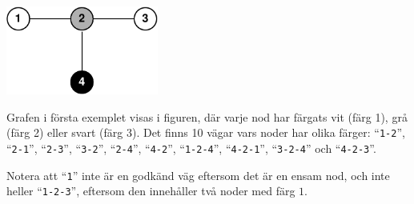 \section*{}

\includegraphics[width=5cm]{pathsfig.pdf}

Grafen i första exemplet visas i figuren, där varje nod har färgats vit (färg 1), grå (färg 2) eller svart (färg 3). Det finns 10 vägar vars noder har olika färger: ``\texttt{1-2}'', ``\texttt{2-1}'', ``\texttt{2-3}'', ``\texttt{3-2}'', ``\texttt{2-4}'', ``\texttt{4-2}'', ``\texttt{1-2-4}'', ``\texttt{4-2-1}'', ``\texttt{3-2-4}'' och ``\texttt{4-2-3}''.

Notera att ``\texttt{1}'' inte är en godkänd väg eftersom det är en ensam nod, och inte heller ``\texttt{1-2-3}'', eftersom den innehåller två noder med färg $1$.

